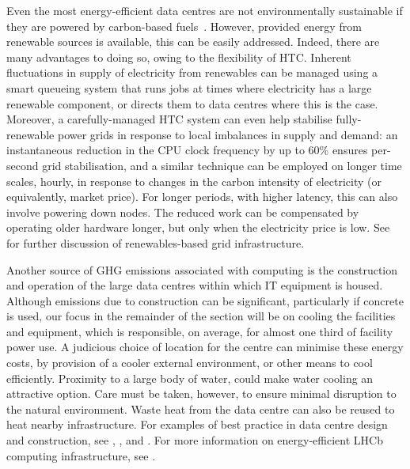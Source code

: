 \documentclass[../SustainableHEP.tex]{subfiles}
\begin{document}
Even the most energy-efficient data centres are not environmentally sustainable if they are powered by carbon-based fuels~\cite{Bloom:2022gux}.  
However, provided energy from renewable sources is available, this can be easily addressed. Indeed, there are many advantages to doing so, owing to the flexibility of HTC.
Inherent fluctuations in supply of electricity from renewables can be managed using a smart queueing system that runs jobs at times where electricity has a large renewable component,
 or directs them to data centres where this is the case.  
Moreover, a carefully-managed HTC system can even help stabilise fully-renewable power grids in response to local imbalances in supply and demand: 
an instantaneous reduction in the CPU clock frequency by up to 60\% ensures per-second grid stabilisation,
and a similar technique can be employed on longer time scales, \eg hourly, in response to changes in the carbon intensity of electricity (or equivalently, market price). 
For longer periods, with higher latency, this can also involve powering down nodes. 
The reduced work can be compensated by operating older hardware longer, but only when the electricity price is low.  
See  for further discussion of renewables-based grid infrastructure.  

Another source of GHG emissions associated with computing is the construction and operation of the large data centres within which IT equipment is housed.  Although emissions due to construction can be significant, particularly if concrete is used, our focus in the remainder of the section will be on cooling the facilities and equipment, which is responsible, on average, for almost one third of facility power use. A judicious choice of location for the centre can minimise these energy costs, by provision of a cooler external environment, or other means to cool efficiently.  Proximity to a large body of water, \eg could make water cooling an attractive option.  Care must be taken, however, to ensure minimal disruption to the natural environment.  Waste heat from the data centre can also be reused to heat nearby infrastructure. For examples of best practice in data centre design and construction, see , , and .  For more information on energy-efficient LHCb computing infrastructure, see . 

\end{document}
